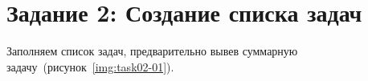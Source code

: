 \section{Задание 2: Создание списка задач}

Заполняем список задач, предварительно вывев суммарную
задачу~(рисунок~\ref{img:task02-01}).

